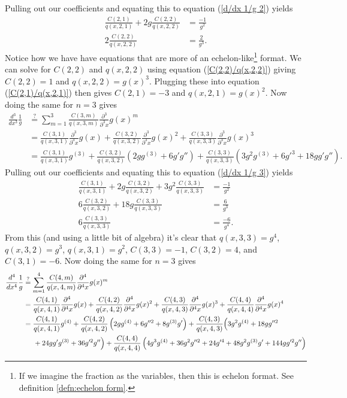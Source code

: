 Pulling out our coefficients and equating this to equation (\ref{d/dx 1/g 2}) yields
\begin{align}
	\frac{C(2,1)}{q(x, 2, 1)} + 2g\frac{C(2,2)}{q(x, 2, 2)} &= \frac{-1}{g^2} \label{C(2,1)/q(x,2,1)} \\
	2\frac{C(2,2)}{q(x, 2, 2)} &= \frac{2}{g^3} \label{C(2,2)/q(x,2,2)}.
\end{align}
Notice how we have have equations that are more of an echelon-like\footnote{If we imagine the fraction as the variables, then this is echelon format. See definition \ref{defn:echelon form}.} format. We can solve for $C(2,2)$ and $q(x,2,2)$ using equation (\ref{C(2,2)/q(x,2,2)}) giving $C(2,2)=1$ and $q(x,2,2)= g(x)^3$. Plugging these into equation (\ref{C(2,1)/q(x,2,1)}) then gives $C(2,1)=-3$ and $q(x,2,1) = g(x)^2$. Now doing the same for $n=3$ gives
\begin{align}
	\frac{d^3}{dx^3}\frac{1}{g} &\overset{?}{=} \sum_{m=1}^{3}\frac{C(3,m)}{q(x, 3, m)}\frac{\partial^3}{\partial^3 x}g(x)^m \\
	&= \frac{C(3,1)}{q(x, 3, 1)}\frac{\partial^3}{\partial^3 x}g(x)+\frac{C(3,2)}{q(x, 3, 2)}\frac{\partial^3}{\partial^3 x}g(x)^2+\frac{C(3,3)}{q(x, 3, 3)}\frac{\partial^3}{\partial^3 x}g(x)^3 \\
	&= \frac{C(3,1)}{q(x, 3, 1)}g^{(3)}+\frac{C(3,2)}{q(x, 3, 2)}\left(2gg^{(3)}+6g'g''\right) + \frac{C(3,3)}{q(x, 3, 3)}\left(3g^2g^{(3)}+6g'^3+18gg'g''\right).
\end{align}
Pulling out our coefficients and equating this to equation (\ref{d/dx 1/g 3}) yields
\begin{align}
	\frac{C(3,1)}{q(x, 3, 1)}+2g\frac{C(3,2)}{q(x, 3, 2)} + 3g^2\frac{C(3,3)}{q(x, 3, 3)} &= \frac{-1}{g^2} \\
	6\frac{C(3,2)}{q(x, 3, 2)} + 18g\frac{C(3,3)}{q(x, 3, 3)} &= \frac{6}{g^3} \\
	6\frac{C(3,3)}{q(x, 3, 3)} &= \frac{-6}{g^4}.
\end{align}
From this (and using a little bit of algebra) it's clear that $q(x,3,3)=g^4$, $q(x,3,2) = g^3$, $q(x,3,1) = g^2$, $C(3,3) = -1$, $C(3,2)=4$, and $C(3,1)=-6$. Now doing the same for $n=3$ gives
\begin{align}
	\frac{d^4}{dx^4}\frac{1}{g} &\overset{?}{=} \sum_{m=1}^{4}\frac{C(4,m)}{q(x, 4, m)}\frac{\partial^4}{\partial^4 x}g(x)^m \\
	&= \frac{C(4,1)}{q(x, 4, 1)}\frac{\partial^4}{\partial^4 x}g(x)+\frac{C(4,2)}{q(x, 4, 2)}\frac{\partial^4}{\partial^4 x}g(x)^2+\frac{C(4,3)}{q(x, 4, 3)}\frac{\partial^4}{\partial^4 x}g(x)^3+\frac{C(4,4)}{q(x, 4, 4)}\frac{\partial^4}{\partial^4 x}g(x)^4 \\
	&= \frac{C(4,1)}{q(x, 4, 1)}g^{(4)}+\frac{C(4,2)}{q(x, 4, 2)}\left(2gg^{(4)}+6g''^2+8g^{(3)}g'\right)+\frac{C(4,3)}{q(x, 4, 3)}\Big(3g^2g^{(4)}+18gg''^2 \nonumber\\&\hspace{.5cm}+24gg'g^{(3)}+36g'^2g''\Big)+\frac{C(4,4)}{q(x, 4, 4)}\left(4 g^3 g^{(4)} + 36 g^2 g''^2 + 24 g'^4 + 48 g^2 g^{(3)} g' + 144 g g'^2 g''\right)
\end{align}
